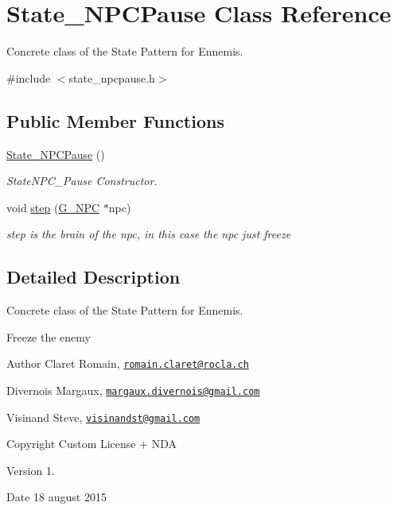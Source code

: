 \hypertarget{class_state___n_p_c_pause}{}\section{State\+\_\+\+N\+P\+C\+Pause Class Reference}
\label{class_state___n_p_c_pause}


Concrete class of the State Pattern for Ennemis.  




{\ttfamily \#include $<$state\+\_\+npcpause.\+h$>$}

\subsection*{Public Member Functions}
\begin{DoxyCompactItemize}
\item 
\hypertarget{class_state___n_p_c_pause_a1d76054bb7712a85ae31b5ae9280195e}{}\hyperlink{class_state___n_p_c_pause_a1d76054bb7712a85ae31b5ae9280195e}{State\+\_\+\+N\+P\+C\+Pause} ()\label{class_state___n_p_c_pause_a1d76054bb7712a85ae31b5ae9280195e}

\begin{DoxyCompactList}\small\item\em State\+N\+P\+C\+\_\+\+Pause Constructor. \end{DoxyCompactList}\item 
void \hyperlink{class_state___n_p_c_pause_a14542459d2844c8f5ee2b1c628611f7b}{step} (\hyperlink{class_g___n_p_c}{G\+\_\+\+N\+P\+C} $\ast$npc)
\begin{DoxyCompactList}\small\item\em step is the brain of the npc, in this case the npc just freeze \end{DoxyCompactList}\end{DoxyCompactItemize}


\subsection{Detailed Description}
Concrete class of the State Pattern for Ennemis. 

Freeze the enemy \begin{DoxyAuthor}{Author}
Claret Romain, \href{mailto:romain.claret@rocla.ch}{\tt romain.\+claret@rocla.\+ch} 

Divernois Margaux, \href{mailto:margaux.divernois@gmail.com}{\tt margaux.\+divernois@gmail.\+com} 

Visinand Steve, \href{mailto:visinandst@gmail.com}{\tt visinandst@gmail.\+com} 
\end{DoxyAuthor}
\begin{DoxyCopyright}{Copyright}
Custom License + N\+D\+A 
\end{DoxyCopyright}
\begin{DoxyVersion}{Version}
1. 
\end{DoxyVersion}
\begin{DoxyDate}{Date}
18 august 2015 
\end{DoxyDate}


